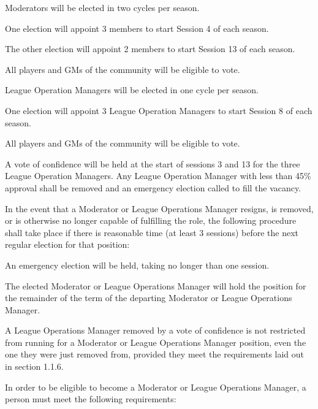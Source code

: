\begin{deepEnumerate}
\begin{deepEnumerate}
	\end{deepEnumerate}
	\item Moderators will be elected in two cycles per season.
	\begin{deepEnumerate}
		\item One election will appoint 3 members to start Session 4 of each season.
		\item The other election will appoint 2 members to start Session 13 of each season.
		\item All players and GMs of the community will be eligible to vote.
	\end{deepEnumerate}
	\item League Operation Managers will be elected in one cycle per season.
	\begin{deepEnumerate}
		\item One election will appoint 3 League Operation Managers to start Session 8 of each season.
		\item All players and GMs of the community will be eligible to vote.
		\item A vote of confidence will be held at the start of sessions 3 and 13 for the three League Operation Managers. Any League Operation Manager with less than
		 45\% approval shall be removed and an emergency election called to fill the vacancy.
	\end{deepEnumerate}
	\item In the event that a Moderator or League Operations Manager resigns, is removed, or is otherwise no longer capable of fulfilling the role, the following
	procedure shall take place if there is reasonable time (at least 3 sessions) before the next regular election for that position:
	\begin{deepEnumerate}
		\item An emergency election will be held, taking no longer than one session.		
		\item The elected Moderator or League Operations Manager will hold the position for the remainder of the term of the departing Moderator or League Operations Manager.
		\item A League Operations Manager removed by a vote of confidence is not restricted from running for a Moderator or League Operations Manager position,
		even the one they were just removed from, provided they meet the requirements laid out in section 1.1.6.
	\end{deepEnumerate}
	\item In order to be eligible to become a Moderator or League Operations Manager, a person must meet the following requirements:

\end{deepEnumerate}
